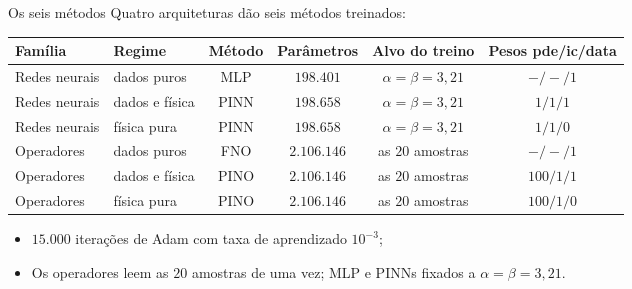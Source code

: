 \begin{frame}{Os seis métodos}
  Quatro arquiteturas dão seis métodos treinados:
  \vspace{4pt}
  \begin{center}
    \small
    \setlength{\tabcolsep}{4pt}
    \begin{tabular}{@{}llcccc@{}}
      \toprule
      \textbf{Família} & \textbf{Regime} & \textbf{Método} & \textbf{Parâmetros} & \textbf{Alvo do treino} & \textbf{Pesos pde/ic/data} \\
      \midrule
      Redes neurais & dados puros      & MLP  & $198.401$   & $\alpha=\beta=3{,}21$ & $-/-/1$ \\
      Redes neurais & dados e física   & PINN & $198.658$   & $\alpha=\beta=3{,}21$ & $1/1/1$ \\
      Redes neurais & física pura      & PINN & $198.658$   & $\alpha=\beta=3{,}21$ & $1/1/0$ \\
      \midrule
      Operadores    & dados puros      & FNO  & $2.106.146$ & as $20$ amostras & $-/-/1$ \\
      Operadores    & dados e física   & PINO & $2.106.146$ & as $20$ amostras & $100/1/1$ \\
      Operadores    & física pura      & PINO & $2.106.146$ & as $20$ amostras & $100/1/0$ \\
      \bottomrule
    \end{tabular}
  \end{center}
  \vspace{2pt}
  \begin{itemize}[<+->]
    \item $15.000$ iterações de Adam com taxa de aprendizado $10^{-3}$;
    \item Os operadores leem as $20$ amostras de uma vez; MLP e PINNs fixados a $\alpha=\beta=3{,}21$.
  \end{itemize}
\end{frame}

